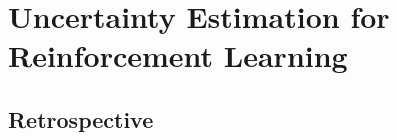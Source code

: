 \chapter{Uncertainty Estimation for Reinforcement Learning}
\label{chap:reinforcement_learning}

\section*{Retrospective}
%